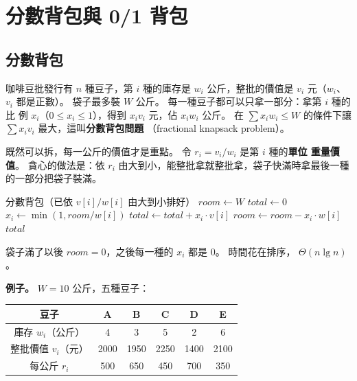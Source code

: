 \section{分數背包與 0/1 背包}
\label{sec:gr-knapsack}

\subsection{分數背包}

咖啡豆批發行有 $n$ 種豆子，第 $i$ 種的庫存是 $w_i$ 公斤，整批的價值是 $v_i$ 元（$w_i$、
$v_i$ 都是正數）。 袋子最多裝 $W$ 公斤。 每一種豆子都可以只拿一部分：拿第 $i$ 種的比
例 $x_i$（$0 \le x_i \le 1$），得到 $x_i v_i$ 元，佔 $x_i w_i$ 公斤。 在
$\sum x_i w_i \le W$ 的條件下讓 $\sum x_i v_i$ 最大，這叫\textbf{分數背包問題}
（fractional knapsack problem）。

既然可以拆，每一公斤的價值才是重點。 令 $r_i = v_i / w_i$ 是第 $i$ 種的\textbf{單位
重量價值}。 貪心的做法是：依 $r_i$ 由大到小，能整批拿就整批拿，袋子快滿時拿最後一種
的一部分把袋子裝滿。

\begin{pseudo}[label=alg:gr-frac, unbreakable]{分數背包（已依 $v[i] / w[i]$ 由大到小排好）}
    \State $\mathit{room} \gets W$
    \State $\mathit{total} \gets 0$
        \State $x_i \gets \min(1, \mathit{room} / w[i])$ 
        \State $\mathit{total} \gets \mathit{total} + x_i \cdot v[i]$
        \State $\mathit{room} \gets \mathit{room} - x_i \cdot w[i]$
    \EndFor
    \State \Return $\mathit{total}$
\EndFunction
\end{pseudo}

袋子滿了以後 $\mathit{room} = 0$，之後每一種的 $x_i$ 都是 $0$。 時間花在排序，
$\Theta(n \lg n)$。

\textbf{例子。} $W = 10$ 公斤，五種豆子：

\begin{center}
\begin{tabular}{cccccc}
\toprule
豆子 & A & B & C & D & E \\
\midrule
庫存 $w_i$（公斤） & 4 & 3 & 5 & 2 & 6 \\
整批價值 $v_i$（元） & 2000 & 1950 & 2250 & 1400 & 2100 \\
每公斤 $r_i$ & 500 & 650 & 450 & 700 & 350 \\
\bottomrule
\end{tabular}
\end{center}

